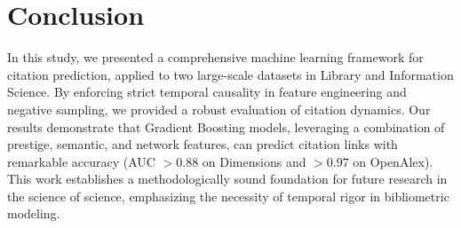 \documentclass[12pt,a4paper]{article}
\begin{document}
\section{Conclusion}
In this study, we presented a comprehensive machine learning framework for citation prediction, applied to two large-scale datasets in Library and Information Science. By enforcing strict temporal causality in feature engineering and negative sampling, we provided a robust evaluation of citation dynamics. Our results demonstrate that Gradient Boosting models, leveraging a combination of prestige, semantic, and network features, can predict citation links with remarkable accuracy (AUC $> 0.88$ on Dimensions and $> 0.97$ on OpenAlex). This work establishes a methodologically sound foundation for future research in the science of science, emphasizing the necessity of temporal rigor in bibliometric modeling.

\newpage


\end{document}
